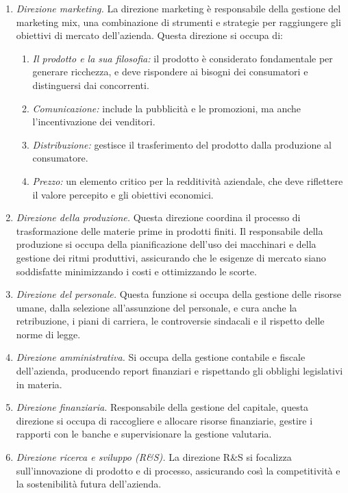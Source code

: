 \begin{enumerate}
    \item \textit{Direzione marketing.} La direzione marketing è responsabile della gestione del marketing mix, una combinazione di strumenti e strategie per raggiungere gli obiettivi di mercato dell'azienda. Questa direzione si occupa di:
    \begin{enumerate}
        \item \textit{Il prodotto e la sua filosofia:} il prodotto è considerato fondamentale per generare ricchezza, e deve rispondere ai bisogni dei consumatori e distinguersi dai concorrenti.
        \item \textit{Comunicazione:} include la pubblicità e le promozioni, ma anche l'incentivazione dei venditori.
        \item \textit{Distribuzione:} gestisce il trasferimento del prodotto dalla produzione al consumatore.
        \item \textit{Prezzo:} un elemento critico per la redditività aziendale, che deve riflettere il valore percepito e gli obiettivi economici.
    \end{enumerate}
    \item \textit{Direzione della produzione.} Questa direzione coordina il processo di trasformazione delle materie prime in prodotti finiti. Il responsabile della produzione si occupa della pianificazione dell'uso dei macchinari e della gestione dei ritmi produttivi, assicurando che le esigenze di mercato siano soddisfatte minimizzando i costi e ottimizzando le scorte.
    \item \textit{Direzione del personale.} Questa funzione si occupa della gestione delle risorse umane, dalla selezione all’assunzione del personale, e cura anche la retribuzione, i piani di carriera, le controversie sindacali e il rispetto delle norme di legge.
    \item \textit{Direzione amministrativa.} Si occupa della gestione contabile e fiscale dell'azienda, producendo report finanziari e rispettando gli obblighi legislativi in materia.
    \item \textit{Direzione finanziaria.} Responsabile della gestione del capitale, questa direzione si occupa di raccogliere e allocare risorse finanziarie, gestire i rapporti con le banche e supervisionare la gestione valutaria.
    \item \textit{Direzione ricerca e sviluppo (R\&S).} La direzione R\&S si focalizza sull'innovazione di prodotto e di processo, assicurando così la competitività e la sostenibilità futura dell'azienda.
\end{enumerate}

